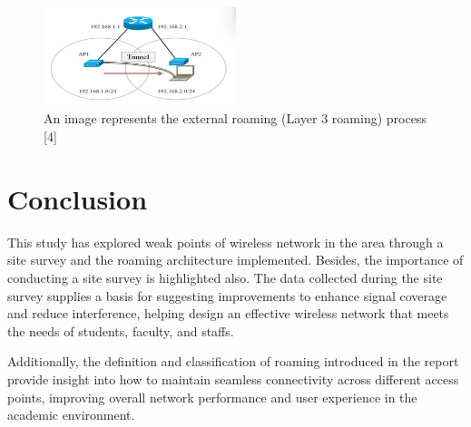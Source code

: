 \documentclass[conference]{IEEEtran}
\begin{document}
\begin{figure}
    \centering
    \includegraphics[width=0.5\textwidth]{fig9.png}
    \caption{An image represents the external roaming (Layer 3 roaming) process [4]}
    \label{fig:enter-label}
\end{figure}

\section{Conclusion}
This study has explored weak points of wireless network in the area through a site survey and the roaming architecture implemented. Besides, the importance of conducting a site survey is highlighted also. The data collected during the site survey supplies a basis for suggesting improvements to enhance signal coverage and reduce interference, helping design an effective wireless network that meets the needs of students, faculty, and staffs.

Additionally, the definition and classification of roaming introduced in the report provide insight into how to maintain seamless connectivity across different access points, improving overall network performance and user experience in the academic environment.



\end{document}
